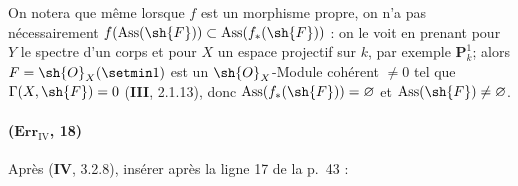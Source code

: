 \begin{env}[3.1.10.5]
\label{IV.3.1.10.5}
On notera que même lorsque $f$ est un morphisme propre, on n'a pas
nécessairement
$f(\operatorname{Ass}(\sh{F}))\subset\operatorname{Ass}(f_*(\sh{F}))$ :
on le voit en prenant pour $Y$ le spectre d'un corps et pour $X$ un
espace projectif sur $k$, par exemple $\mathbf P^1_k$; alors
$F=\sh{O}_X(\setmin 1)$ est un $\sh{O}_X$-Module cohérent $\neq0$ tel
que $\Gamma(X,\sh{F})=0$ (\textbf{III}, 2.1.13), donc
$\operatorname{Ass}(f_*(\sh{F}))=\varnothing$ et
$\operatorname{Ass}(\sh{F})\neq\varnothing$.
\end{env}

\paragraph{($\mathbf{Err}_{\mathrm{IV}}$, 18)}
Après (\textbf{IV}, 3.2.8), insérer après la ligne 17 de la p.~43 :

